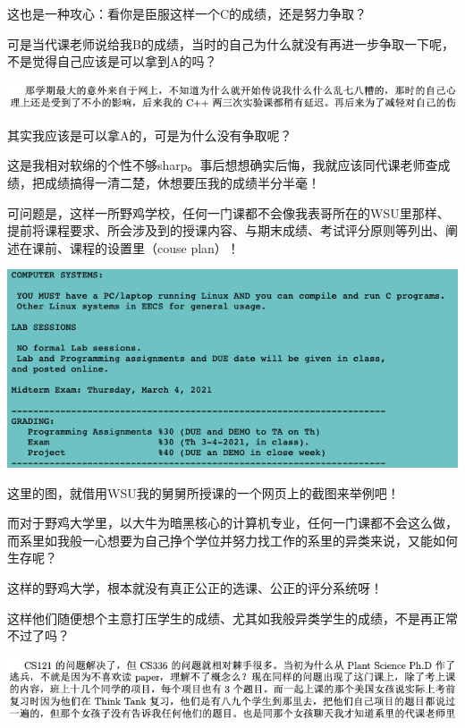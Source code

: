 \documentclass[9pt, b5paper]{article}
\begin{document}
这也是一种攻心：看你是臣服这样一个C的成绩，还是努力争取？

可是当代课老师说给我B的成绩，当时的自己为什么就没有再进一步争取一下呢，不是觉得自己应该是可以拿到A的吗？

\begin{center}
\includegraphics[width=.9\linewidth]{./pic/backups_plans_20210424_210025.png}
\end{center}

其实我应该是可以拿A的，可是为什么没有争取呢？

这是我相对软绵的个性不够sharp。事后想想确实后悔，我就应该同代课老师查成绩，把成绩搞得一清二楚，休想要压我的成绩半分半毫！

可问题是，这样一所野鸡学校，任何一门课都不会像我表哥所在的WSU里那样、提前将课程要求、所会涉及到的授课内容、与期末成绩、考试评分原则等列出、阐述在课前、课程的设置里（couse plan）！

\begin{center}
\includegraphics[width=.9\linewidth]{./pic/backups_plans_20210425_171604.png}
\end{center}

这里的图，就借用WSU我的舅舅所授课的一个网页上的截图来举例吧！

而对于野鸡大学里，以大牛为暗黑核心的计算机专业，任何一门课都不会这么做，而系里如我般一心想要为自己挣个学位并努力找工作的系里的异类来说，又能如何生存呢？

这样的野鸡大学，根本就没有真正公正的选课、公正的评分系统呀！

这样他们随便想个主意打压学生的成绩、尤其如我般异类学生的成绩，不是再正常不过了吗？

\begin{center}
\includegraphics[width=.9\linewidth]{./pic/backups_plans_20210424_210204.png}
\end{center}
\end{document}
